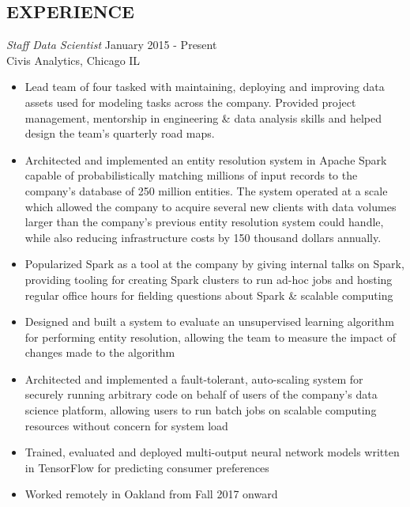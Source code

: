 \documentclass[line,margin]{res}
\begin{document}
\address{waltaskew@gmail.com}
\address{404-819-9796}

\begin{resume}

\section{EXPERIENCE}
        {\sl Staff Data Scientist} \hfill January 2015 - Present \\
        Civis Analytics, Chicago IL
        \begin{itemize}
          \item Lead team of four tasked with maintaining, deploying
            and improving data assets used for modeling tasks across
            the company. Provided project management, mentorship in
            engineering \& data analysis skills and helped design the
            team's quarterly road maps.
          \item Architected and implemented an entity resolution
            system in Apache Spark capable of probabilistically
            matching millions of input records to the company's
            database of 250 million entities.
            The system operated at a scale which allowed the company
            to acquire several new clients with data volumes larger
            than the company's previous entity resolution system could
            handle, while also reducing infrastructure costs by 150
            thousand dollars annually.
          \item Popularized Spark as a tool at the company by giving
            internal talks on Spark, providing tooling for creating
            Spark clusters to run ad-hoc jobs and hosting regular
            office hours for fielding questions about Spark \&
            scalable computing
          \item Designed and built a system to evaluate an unsupervised
            learning algorithm for performing entity resolution,
            allowing the team to measure the impact of changes made to
            the algorithm
          \item Architected and implemented a fault-tolerant,
            auto-scaling system for securely running arbitrary code on
            behalf of users of the company's data science platform,
            allowing users to run batch jobs on scalable computing
            resources without concern for system load
          \item Trained, evaluated and deployed multi-output neural
            network models written in TensorFlow for predicting
            consumer preferences
          \item Worked remotely in Oakland from Fall 2017 onward
        \end{itemize}


\end{resume}
\end{document}
